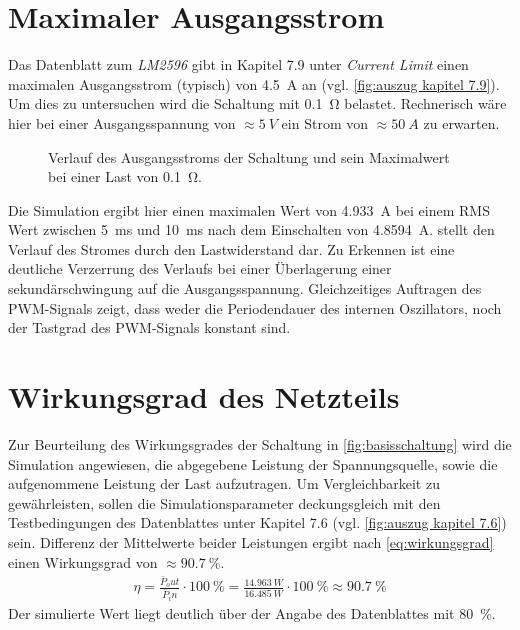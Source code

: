 	\section{Maximaler Ausgangsstrom}
		Das Datenblatt zum \textit{LM2596} gibt in Kapitel 7.9 unter \textit{Current Limit} einen maximalen Ausgangsstrom (typisch) von
		\SI{4,5}{A} an (vgl. \cref{fig:auszug kapitel 7.9}). Um dies zu untersuchen wird die Schaltung mit \SI{0,1}{\ohm} belastet.
		Rechnerisch wäre hier bei einer Ausgangsspannung von \(\approx \SI{5}{V}\) ein Strom von \(\approx \SI{50}{A}\) zu erwarten.
		\begin{figure}[h]
			\centering
			
			\caption[Maximaler Ausgangsstrom]{Verlauf des Ausgangsstroms der Schaltung und sein Maximalwert bei einer Last von \SI{0,1}{\ohm}.}
			\label{fig:max ausgangsstrom}
		\end{figure}
		Die Simulation ergibt hier einen maximalen Wert von \SI{4,933}{A} bei einem RMS Wert zwischen \SI{5}{ms} und \SI{10}{ms} nach dem Einschalten von \SI{4.8594}{A}.
		 stellt den Verlauf des Stromes durch den Lastwiderstand dar. Zu Erkennen ist eine deutliche Verzerrung des Verlaufs
		bei einer Überlagerung einer sekundärschwingung auf die Ausgangsspannung. Gleichzeitiges Auftragen des PWM-Signals zeigt, dass weder die Periodendauer des
		internen Oszillators, noch der Tastgrad des PWM-Signals konstant sind.
	\section{Wirkungsgrad des Netzteils}
		Zur Beurteilung des Wirkungsgrades der Schaltung in \cref{fig:basisschaltung} wird die Simulation angewiesen, die abgegebene Leistung der Spannungsquelle, sowie
		die aufgenommene Leistung der Last aufzutragen. Um Vergleichbarkeit zu gewährleisten, sollen die Simulationsparameter deckungsgleich mit den Testbedingungen des Datenblattes
		unter Kapitel 7.6 (vgl. \cref{fig:auszug kapitel 7.6}) sein. Differenz der Mittelwerte beider Leistungen ergibt nach \cref{eq:wirkungsgrad} einen Wirkungsgrad von \(\approx \SI{90,7}{\percent}\).
		\begin{align}
			\eta = \frac{\bar{P}_out}{\bar{P}_in} \cdot \SI{100}{\percent} = \frac{\SI{14,963}{W}}{\SI{16,485}{W}} \cdot \SI{100}{\percent} \approx \SI{90,7}{\percent}
			\label{eq:wirkungsgrad}
		\end{align}%
		Der simulierte Wert liegt deutlich über der Angabe des Datenblattes mit \SI{80}{\percent}.